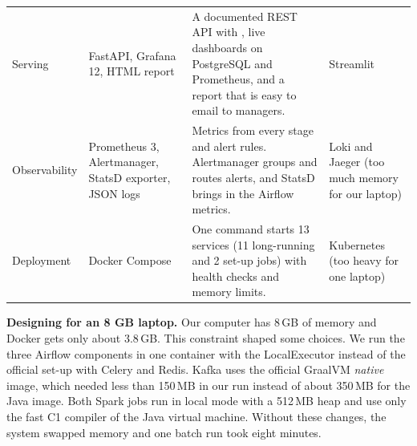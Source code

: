 \begin{table}[!htb]
\begin{tabularx}{\textwidth}{@{}P{1.9cm} P{2.5cm} L P{2.8cm}@{}}
Serving & FastAPI, Grafana 12, HTML report &
A documented REST API with , live dashboards on PostgreSQL and Prometheus, and a report that
is easy to email to managers. &
Streamlit \\
Observability & Prometheus 3, Alertmanager, StatsD exporter, JSON logs &
Metrics from every stage and alert rules. Alertmanager groups and routes alerts, and StatsD brings in the
Airflow metrics. &
Loki and Jaeger (too much memory for our laptop) \\
Deployment & Docker Compose &
One command starts 13 services (11 long-running and 2 set-up jobs) with health checks and memory limits. &
Kubernetes (too heavy for one laptop) \\
\bottomrule
\end{tabularx}
\end{table}

\textbf{Designing for an 8 GB laptop.} Our computer has 8\,GB of memory and Docker gets only about
3.8\,GB. This constraint shaped some choices. We run the three Airflow components in one container with the
LocalExecutor instead of the official set-up with Celery and Redis. Kafka uses the official GraalVM
\emph{native} image, which needed less than 150\,MB in our run instead of about 350\,MB for the Java image. Both Spark jobs
run in local mode with a 512\,MB heap and use only the fast C1 compiler of the Java virtual machine. Without
these changes, the system swapped memory and one batch run took eight minutes.
